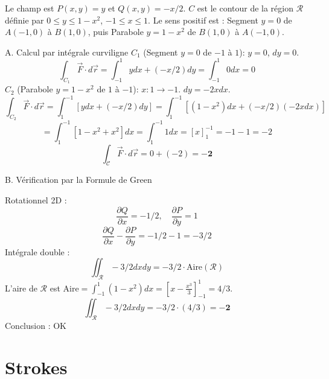 \documentclass[french]{yLectureNote}
\renewcommand{\vec}{\overrightarrow}
\begin{document}
Le champ est $P(x,y)=y$ et $Q(x,y)=-x/2$. $C$ est le contour de la région $\mathcal{R}$ définie par $0 \le y \le 1-x^2$, $-1 \le x \le 1$. Le sens positif est : Segment $y=0$ de $A(-1, 0)$ à $B(1, 0)$, puis Parabole $y=1-x^2$ de $B(1, 0)$ à $A(-1, 0)$.

A. Calcul par intégrale curviligne
$C_1$ (Segment $y=0$ de $-1$ à $1$): $y=0$, $dy=0$.
    $$
    \int_{C_1} \vec{F}\cdot d\vec{r} = \int_{-1}^{1} y dx + (-x/2) dy = \int_{-1}^{1} 0 dx = 0
    $$
$C_2$ (Parabole $y=1-x^2$ de $1$ à $-1$): $x: 1 \to -1$. $dy=-2x dx$.
    $$
    \int_{C_2} \vec{F}\cdot d\vec{r} = \int_{1}^{-1} [y dx + (-x/2) dy] = \int_{1}^{-1} [(1-x^2) dx + (-x/2) (-2x dx)]
    $$
    $$
    = \int_{1}^{-1} [1-x^2 + x^2] dx = \int_{1}^{-1} 1 dx = [x]_{1}^{-1} = -1 - 1 = -2
    $$
$$
\int_{\mathcal{C}}\vec{F}\cdot d\vec{r} = 0 + (-2) = \mathbf{-2}
$$

B. Vérification par la Formule de Green

Rotationnel 2D :
$$
\frac{\partial Q}{\partial x} = -1/2, \quad \frac{\partial P}{\partial y} = 1
$$
$$
\frac{\partial Q}{\partial x}-\frac{\partial P}{\partial y} = -1/2 - 1 = -3/2
$$
Intégrale double :
$$
\iint_{\mathcal{R}} -3/2 dx dy = -3/2 \cdot \text{Aire}(\mathcal{R})
$$
L'aire de $\mathcal{R}$ est $\text{Aire} = \int_{-1}^{1} (1-x^2) dx = \left[x - \frac{x^3}{3}\right]_{-1}^{1} = 4/3$.
$$
\iint_{\mathcal{R}} -3/2 dx dy = -3/2 \cdot (4/3) = \mathbf{-2}
$$
Conclusion : OK
\section{Strokes}


 
\end{document}
